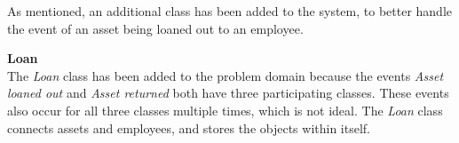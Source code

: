 As mentioned, an additional class has been added to the system, to better handle the event of an asset being loaned out to an employee.

\textbf{Loan}\\
The \textit{Loan} class has been added to the problem domain because the events \textit{Asset loaned out} and \textit{Asset returned} both have three participating classes. These events also occur for all three classes multiple times, which is not ideal. The \textit{Loan} class connects assets and employees, and stores the objects within itself. 